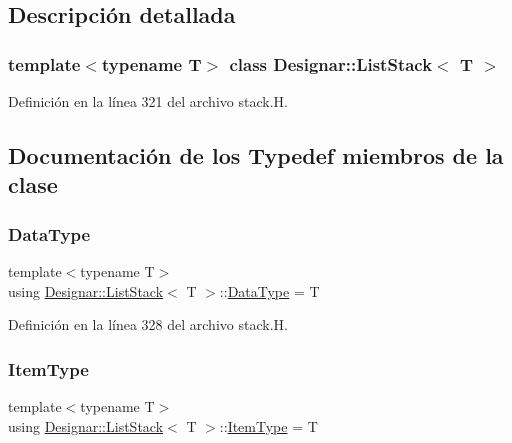 \subsection{Descripción detallada}
\subsubsection*{template$<$typename T$>$\newline
class Designar\+::\+List\+Stack$<$ T $>$}



Definición en la línea 321 del archivo stack.\+H.



\subsection{Documentación de los \textquotesingle{}Typedef\textquotesingle{} miembros de la clase}
\mbox{\label{class_designar_1_1_list_stack_a9bdd8f2e28bca0397b835faa08a1d0dc}} 
\subsubsection{\texorpdfstring{Data\+Type}{DataType}}
{\footnotesize\ttfamily template$<$typename T$>$ \\
using \hyperlink{class_designar_1_1_list_stack}{Designar\+::\+List\+Stack}$<$ T $>$\+::\hyperlink{class_designar_1_1_s_l_list_aa98659227d90b392a1b52fa5e9b292f4}{Data\+Type} =  T}



Definición en la línea 328 del archivo stack.\+H.

\mbox{\label{class_designar_1_1_list_stack_a5a584752d4cfca9e791071f1553d7c69}} 
\subsubsection{\texorpdfstring{Item\+Type}{ItemType}}
{\footnotesize\ttfamily template$<$typename T$>$ \\
using \hyperlink{class_designar_1_1_list_stack}{Designar\+::\+List\+Stack}$<$ T $>$\+::\hyperlink{class_designar_1_1_s_l_list_a8ec47bfb6b0d74c8f85111b7b3c05cb2}{Item\+Type} =  T}



